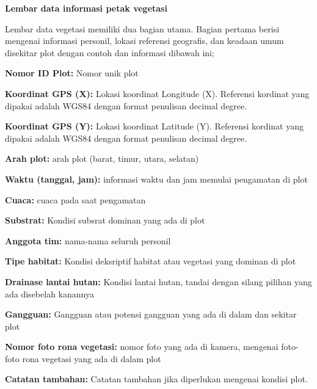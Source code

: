 \documentclass[
]{book}
\begin{document}
\textbf{Lembar data informasi petak vegetasi}

Lembar data vegetasi memiliki dua bagian utama. Bagian pertama berisi mengenai informasi personil, lokasi referensi geografis, dan keadaan umum disekitar plot dengan contoh dan informasi dibawah ini;

\textbf{Nomor ID Plot:} Nomor unik plot

\textbf{Koordinat GPS (X):} Lokasi koordinat Longitude (X). Referensi kordinat yang dipakai adalah WGS84 dengan format penulisan decimal degree.

\textbf{Koordinat GPS (Y):} Lokasi koordinat Latitude (Y). Referensi kordinat yang dipakai adalah WGS84 dengan format penulisan decimal degree.

\textbf{Arah plot:} arah plot (barat, timur, utara, selatan)

\textbf{Waktu (tanggal, jam):} informasi waktu dan jam memulai pengamatan di plot

\textbf{Cuaca:} cuaca pada saat pengamatan

\textbf{Substrat:} Kondisi subsrat dominan yang ada di plot

\textbf{Anggota tim:} nama-nama seluruh personil

\textbf{Tipe habitat:} Kondisi deksriptif habitat atau vegetasi yang dominan di plot

\textbf{Drainase lantai hutan:} Kondisi lantai hutan, tandai dengan silang pilihan yang ada disebelah kanannya

\textbf{Gangguan:} Gangguan atau potensi gangguan yang ada di dalam dan sekitar plot

\textbf{Nomor foto rona vegetasi:} nomor foto yang ada di kamera, mengenai foto-foto rona vegetasi yang ada di dalam plot

\textbf{Catatan tambahan:} Catatan tambahan jika diperlukan mengenai kondisi plot.
\end{document}
